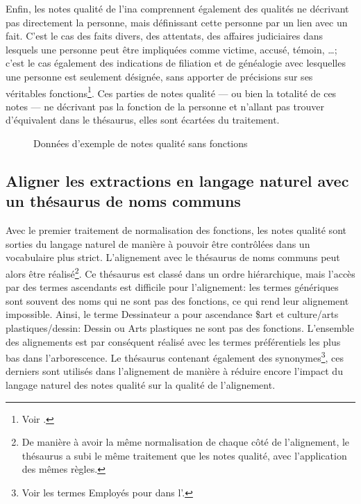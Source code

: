 Enfin, les notes qualité de l'\ac{ina} comprennent également des qualités ne décrivant pas directement la personne, mais définissant cette personne par un lien avec un fait. C'est le cas des faits divers, des attentats, des affaires judiciaires dans lesquels une personne peut être impliquées comme victime, accusé, témoin, \dots; c'est le cas également des indications de filiation et de généalogie avec lesquelles une personne est seulement désignée, sans apporter de précisions sur ses véritables fonctions\footnote{Voir .}. Ces parties de notes qualité --- ou bien la totalité de ces notes --- ne décrivant pas la fonction de la personne et n'allant pas trouver d'équivalent dans le thésaurus, elles sont écartées du traitement.
\begin{figure}[!h]
	\centering
	\caption{Données d'exemple de notes qualité sans fonctions}
	\label{exemple_NQ_sans_fonctions}
\end{figure}

\subsection{\label{I-C-3-b}Aligner les extractions en langage naturel avec un thésaurus de noms communs}

Avec le premier traitement de normalisation des fonctions, les notes qualité sont sorties du langage naturel de manière à pouvoir être contrôlées dans un vocabulaire plus strict. L'alignement avec le thésaurus de noms communs peut alors être réalisé\footnote{De manière à avoir la même normalisation de chaque côté de l'alignement, le thésaurus a subi le même traitement que les notes qualité, avec l'application des mêmes règles.}. Ce thésaurus est classé dans un ordre hiérarchique, mais l'accès par des termes ascendants est difficile pour l'alignement: les termes génériques sont souvent des noms qui ne sont pas des fonctions, ce qui rend leur alignement impossible. Ainsi, le terme \og Dessinateur\fg{} a pour ascendance \og \$art et culture/arts plastiques/dessin\fg{}: \og Dessin\fg{} ou \og Arts plastiques\fg{} ne sont pas des fonctions. L'ensemble des alignements est par conséquent réalisé avec les termes préférentiels les plus bas dans l'arborescence. Le thésaurus contenant également des synonymes\footnote{Voir les termes Employés pour dans l'.}, ces derniers sont utilisés dans l'alignement de manière à réduire encore l'impact du langage naturel des notes qualité sur la qualité de l'alignement.\\

